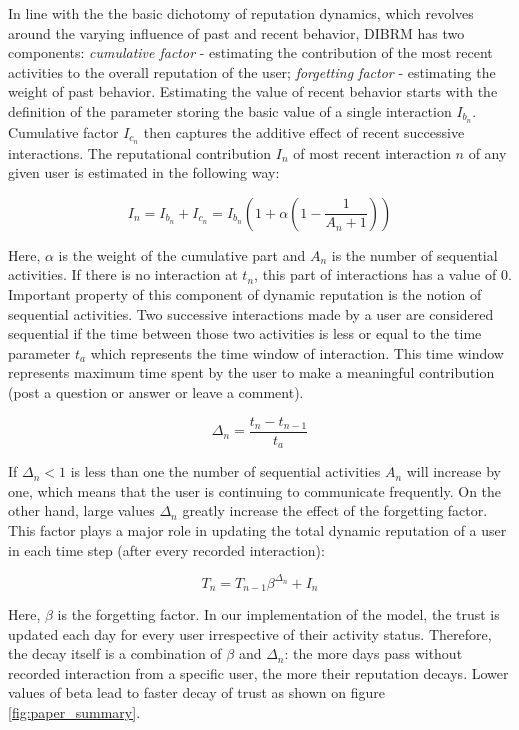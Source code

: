 In line with the the basic dichotomy of reputation dynamics, which revolves around the varying influence of past and recent behavior, DIBRM has two components: \textit{cumulative factor} - estimating the contribution of the most recent activities to the overall reputation of the user; \textit{forgetting factor} - estimating the weight of past behavior. Estimating the value of recent behavior starts with the definition of the parameter storing the basic value of a single interaction $I_{b_{n}}$. Cumulative factor $I_{c_{n}}$ then captures the additive effect of recent successive interactions. The reputational contribution $I_n$ of most recent interaction $n$ of any given user is estimated in the following way:

\begin{equation}\label{eq:ibn}
I_n = I_{b_{n}} + I_{c_{n}} = I_{b_{n}} (1+  \alpha  (1-\frac{1}{A_{n}+1}))
\end{equation}

Here, $\alpha$ is the weight of the cumulative part and $A_{n}$ is the number of sequential activities. If there is no interaction at $t_n$, this part of interactions has a value of 0. Important property of this component of dynamic reputation is the notion of sequential activities. Two successive interactions made by a user are considered sequential if the time between those two activities is less or equal to the time parameter $t_{a}$ which represents the time window of interaction. This time window represents maximum time spent by the user to make a meaningful contribution (post a question or answer or leave a comment).

\begin{equation}\label{eq:deltan}
\Delta_{n}=\frac{t_{n}-t_{n-1}}{t_{a}}
\end{equation}

If $\Delta_{n} < 1$ is less than one the number of sequential activities $A_{n}$ will increase by one, which means that the user is continuing to communicate frequently. On the other hand, large values $\Delta_{n}$ greatly increase the effect of the forgetting factor. This factor plays a major role in updating the total dynamic reputation of a user in each time step (after every recorded interaction):

\begin{equation}\label{eq:tn}
T_{n}=T_{n-1} \beta^{\Delta_{n}}+I_{n}
\end{equation}

Here, $\beta$ is the forgetting factor. In our implementation of the model, the trust is updated each day for every user irrespective of their activity status. Therefore, the decay itself is a combination of $\beta$ and $\Delta_n$: the more days pass without recorded interaction from a specific user, the more their reputation decays. Lower values of beta lead to faster decay of trust as shown on figure \ref{fig:paper_summary}.